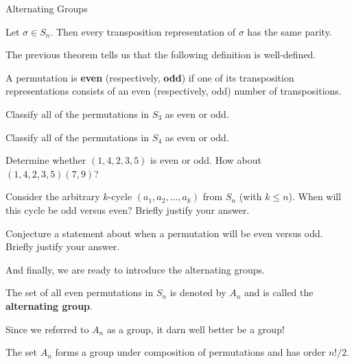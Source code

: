 \begin{section}{Alternating Groups}
\begin{theorem}
Let $\sigma\in S_n$.  Then every transposition representation of $\sigma$ has the same parity.
\end{theorem}

The previous theorem tells us that the following definition is well-defined.

\begin{definition}
A permutation is \textbf{even} (respectively, \textbf{odd}) if one of its transposition representations consists of an even (respectively, odd) number of transpositions.
\end{definition}

\begin{exercise}
Classify all of the permutations in $S_3$ as even or odd.
\end{exercise}

\begin{exercise}
Classify all of the permutations in $S_4$ as even or odd.
\end{exercise}

\begin{exercise}
Determine whether $(1,4,2,3,5)$ is even or odd.  How about $(1,4,2,3,5)(7,9)$?
\end{exercise}

\begin{problem}
Consider the arbitrary $k$-cycle $(a_1,a_2,\ldots, a_k)$ from $S_n$ (with $k\leq n$).  When will this cycle be odd versus even?  Briefly justify your answer. 
\end{problem}

\begin{problem}
Conjecture a statement about when a permutation will be even versus odd.  Briefly justify your answer.
\end{problem}

And finally, we are ready to introduce the alternating groups.

\begin{definition}
The set of all even permutations in $S_n$ is denoted by $A_n$ and is called the \textbf{alternating group}.
\end{definition}

Since we referred to $A_n$ as a group, it darn well better be a group!

\begin{theorem}
The set $A_n$ forms a group under composition of permutations and has order $n!/2$.
\end{theorem}


\end{section}

